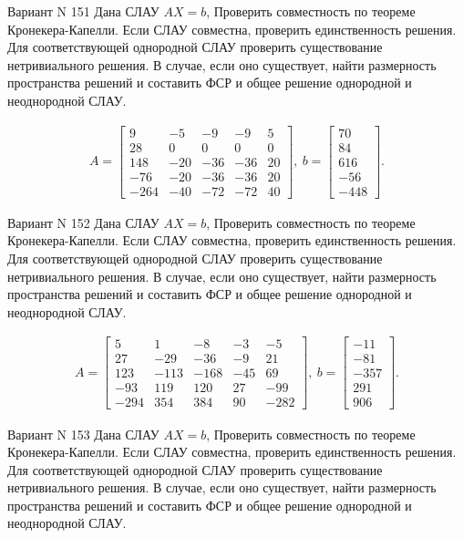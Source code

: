 \documentclass[11pt]{report}
\begin{document}
Вариант N 151
Дана СЛАУ $AX = b$,
Проверить совместность по теореме Кронекера-Капелли. Если СЛАУ совместна, проверить единственность решения.
Для соответствующей однородной СЛАУ проверить существование нетривиального решения. В случае, если оно существует,
найти размерность пространства решений и составить ФСР и общее решение однородной  и неоднородной СЛАУ.


\begin{align*}
 A = \left[\begin{matrix}9 & -5 & -9 & -9 & 5\\28 & 0 & 0 & 0 & 0\\148 & -20 & -36 & -36 & 20\\-76 & -20 & -36 & -36 & 20\\-264 & -40 & -72 & -72 & 40\end{matrix}\right],
\ b = \left[\begin{matrix}70\\84\\616\\-56\\-448\end{matrix}\right]. 
 \end{align*}

Вариант N 152
Дана СЛАУ $AX = b$,
Проверить совместность по теореме Кронекера-Капелли. Если СЛАУ совместна, проверить единственность решения.
Для соответствующей однородной СЛАУ проверить существование нетривиального решения. В случае, если оно существует,
найти размерность пространства решений и составить ФСР и общее решение однородной  и неоднородной СЛАУ.


\begin{align*}
 A = \left[\begin{matrix}5 & 1 & -8 & -3 & -5\\27 & -29 & -36 & -9 & 21\\123 & -113 & -168 & -45 & 69\\-93 & 119 & 120 & 27 & -99\\-294 & 354 & 384 & 90 & -282\end{matrix}\right],
\ b = \left[\begin{matrix}-11\\-81\\-357\\291\\906\end{matrix}\right]. 
 \end{align*}

Вариант N 153
Дана СЛАУ $AX = b$,
Проверить совместность по теореме Кронекера-Капелли. Если СЛАУ совместна, проверить единственность решения.
Для соответствующей однородной СЛАУ проверить существование нетривиального решения. В случае, если оно существует,
найти размерность пространства решений и составить ФСР и общее решение однородной  и неоднородной СЛАУ.
\end{document}
